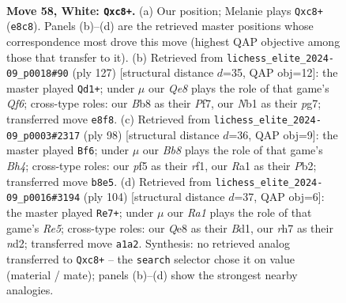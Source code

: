 \documentclass[11pt]{article}
\begin{document}
\clearpage

\begin{figure}[p]\centering
\begin{subfigure}{0.46\textwidth}\centering
\resizebox{\linewidth}{!}{%
\newchessgame
\chessboard[
  setfen={1Bb1Q3/7r/8/p1kp1p2/P6P/8/8/RN4K1 w - - 1 58},
  showmover=false,
  pgfstyle=straightmove, color=movearrow, markmove={e8-c8}
]}
\caption{}
\end{subfigure}\hfill
\begin{subfigure}{0.46\textwidth}\centering
\resizebox{\linewidth}{!}{%
\newchessgame
\chessboard[
  setfen={8/2k2pP1/R4P2/5p2/7P/2P2q2/p4B2/6K1 b - - 3 64},
  showmover=false,
  pgfstyle=straightmove, color=movearrow, markmove={f3-d1}
]}
\caption{}
\end{subfigure}
\\[4pt]
\begin{subfigure}{0.46\textwidth}\centering
\resizebox{\linewidth}{!}{%
\newchessgame
\chessboard[
  setfen={4k3/1pb5/2p4R/p3P3/4K2B/P7/1P6/5r2 w - - 15 50},
  showmover=false,
  pgfstyle=straightmove, color=movearrow, markmove={h4-f6}
]}
\caption{}
\end{subfigure}\hfill
\begin{subfigure}{0.46\textwidth}\centering
\resizebox{\linewidth}{!}{%
\newchessgame
\chessboard[
  setfen={8/1p4kp/2p5/2P1R3/p7/P6P/3n3K/3B4 w - - 0 53},
  showmover=false,
  pgfstyle=straightmove, color=movearrow, markmove={e5-e7}
]}
\caption{}
\end{subfigure}
\caption{\textbf{Move 58, White: \texttt{Qxc8+}.} (a) Our position; Melanie plays \texttt{Qxc8+} (\texttt{e8c8}). Panels (b)--(d) are the retrieved master positions whose correspondence most drove this move (highest QAP objective among those that transfer to it). (b) Retrieved from \texttt{lichess\_elite\_2024-09\_p0018\#90} (ply 127) [structural distance $d$=35, QAP obj=12]: the master played \texttt{Qd1+}; under $\mu$ our \emph{Qe8} plays the role of that game's \emph{Qf6}; cross-type roles: our \emph{B}b8 as their \emph{P}f7, our \emph{N}b1 as their \emph{p}g7; transferred move \texttt{e8f8}. (c) Retrieved from \texttt{lichess\_elite\_2024-09\_p0003\#2317} (ply 98) [structural distance $d$=36, QAP obj=9]: the master played \texttt{Bf6}; under $\mu$ our \emph{Bb8} plays the role of that game's \emph{Bh4}; cross-type roles: our \emph{p}f5 as their \emph{r}f1, our \emph{R}a1 as their \emph{P}b2; transferred move \texttt{b8e5}. (d) Retrieved from \texttt{lichess\_elite\_2024-09\_p0016\#3194} (ply 104) [structural distance $d$=37, QAP obj=6]: the master played \texttt{Re7+}; under $\mu$ our \emph{Ra1} plays the role of that game's \emph{Re5}; cross-type roles: our \emph{Q}e8 as their \emph{B}d1, our \emph{r}h7 as their \emph{n}d2; transferred move \texttt{a1a2}. Synthesis: no retrieved analog transferred to \texttt{Qxc8+} -- the \texttt{search} selector chose it on value (material / mate); panels (b)--(d) show the strongest nearby analogies.}
\label{fig:thought-m114}
\end{figure}
\end{document}
